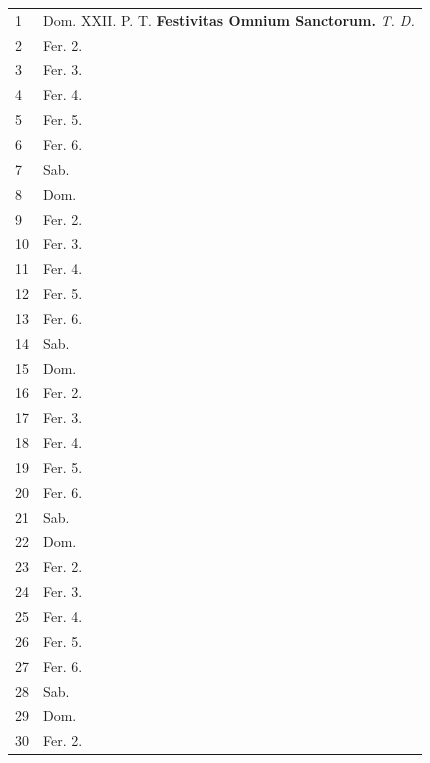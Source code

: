 \documentclass[openany]{book}
\newcommand{\rank}{\textit}
\begin{document}
\thispagestyle{fancy}

\begin{center}
\begin{tabular}{l|p{3in}}
1  & Dom. XXII. P. T. \textbf{Festivitas Omnium Sanctorum.} \rank{T. D.} \\
2  & Fer. 2. \\
3  & Fer. 3. \\
4  & Fer. 4. \\
5  & Fer. 5. \\
6  & Fer. 6. \\
7  & Sab. \\
8  & Dom. \\
9  & Fer. 2. \\
10 & Fer. 3. \\
11 & Fer. 4. \\
12 & Fer. 5. \\
13 & Fer. 6. \\
14 & Sab. \\
15 & Dom. \\
16 & Fer. 2. \\
17 & Fer. 3. \\
18 & Fer. 4. \\
19 & Fer. 5. \\
20 & Fer. 6. \\
21 & Sab. \\
22 & Dom. \\
23 & Fer. 2. \\
24 & Fer. 3. \\
25 & Fer. 4. \\
26 & Fer. 5. \\
27 & Fer. 6. \\
28 & Sab. \\
29 & Dom. \\
30 & Fer. 2. \\
\end{tabular}
\end{center}
\end{document}
